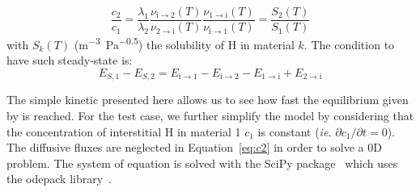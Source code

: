 \begin{equation}
     \frac{c_2}{c_1}=\frac{\lambda_1}{\lambda_2}\frac{\nu_\mathrm{i\rightarrow2}(T)}{\nu_\mathrm{2\rightarrow i}(T)}\frac{\nu_\mathrm{1\rightarrow i}(T)}{\nu_\mathrm{i\rightarrow 1}(T)} = \frac{S_2(T)}{S_1(T)}
\end{equation}
with $S_k(T)$ (\si{m^{-3}.Pa^{-0.5}}) the solubility of H in material $k$.
The condition to have such steady-state is:
\begin{equation}
    E_{S,1}-E_{S,2} = E_\mathrm{i\rightarrow 1}-E_\mathrm{i\rightarrow 2}-E_\mathrm{1\rightarrow i} +E_\mathrm{2\rightarrow i}
    \label{eq:steady}
\end{equation}

\indent The simple kinetic presented here allows us to see how fast the equilibrium given by  is reached.
For the test case, we further simplify the model by considering that the concentration of interstitial H in material 1 $c_1$ is constant (\textit{ie.} $\partial c_1/\partial t=0$).
The diffusive fluxes are neglected in Equation~\ref{eq:c2} in order to solve a 0D problem.
The system of equation is solved with the SciPy package~\cite{virtanen_scipy_2020} which uses the odepack library~\cite{hindmarch_odepack_1982}.

